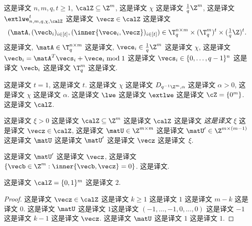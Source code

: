 \begin{definition}\label{def:extlwe} 这是译文 $n,m,q,t \ge 1$, $\calZ \subseteq \Z^m$, 这是译文 $\chi$ 这是译文 $\frac{1}{q}\Z^m$, 这是译文 $\extlwe^t_{n,m,q,\chi,\calZ}$ 这是译文 $\vecz \in \calZ$ 这是译文 \[
(\matA,(\vecb_i)_{i \in [t]},(\inner{\vece_i,\vecz})_{i \in [t]}) \in \T_q^{n \times m} \times (\T_q^m)^t \times ({\textstyle \frac 1 q} \Z)^t.
\] 这是译文, $\matA \in \T_q^{n \times m}$ 这是译文, $\vece_i \in {\textstyle \frac 1 q}\Z^m$ 这是译文 $\chi$, 这是译文 $\vecb_i = \matA^T \vecs_i + \vece_i \bmod 1$ 这是译文 $\vecs_i \in \{0,\ldots,q-1\}^n$ 这是译文 $\vecb_i$ 这是译文 $\T_q^m$ 这是译文. 
\end{definition}


这是译文 $t=1$, 这是译文 $t$. 这是译文 $\chi$ 这是译文 $D_{q^{-1}\Z^{m},\alpha}$ 这是译文 $\alpha>0$, 这是译文 $\chi$ 这是译文 $\alpha$.  这是译文 $\lwe$ 这是译文 $\extlwe$ 这是译文 $\cZ = \{ 0^m \}$.  这是译文 $\calZ$.



\begin{definition}\label{def:qualityofhintset} 这是译文 $\xi>0$ 这是译文 $\calZ \subseteq \Z^m$ 这是译文 $\calZ$ 这是译文 \emph{这是译文} $\xi$ 这是译文 $\vecz \in \calZ$, 这是译文 $\matU \in \Z^{m \times m}$ 这是译文 $\matU'\in \Z^{m \times (m-1)}$ 这是译文 $\matU$ 这是译文 $\matU'$ 这是译文 $\vecz$ 这是译文~$\xi$.
\end{definition}

这是译文 $\matU'$  这是译文 $\vecz$, 这是译文 $\{\vecb \in \Z^m:
  \inner{\vecb,\vecz} = 0\}$. 这是译文.

\begin{claim}\label{clm:qualityofzeroone} 这是译文 $\calZ=\{0,1\}^m$ 这是译文 $2$.
\end{claim}
\begin{proof}
这是译文 $\vecz \in \calZ$ 这是译文 $k \ge 1$ 这是译文 $1$ 这是译文 $m-k$ 这是译文 $0$. 这是译文 $\matU$ 这是译文 $1$这是译文 $(-1,\ldots,-1,0,\ldots,0)$ 这是译文 $-1$ 这是译文 $k-1$ 这是译文 $\vecz$. 这是译文 $\matU$ 这是译文 $1$ 这是译文 $1$.
\end{proof}


